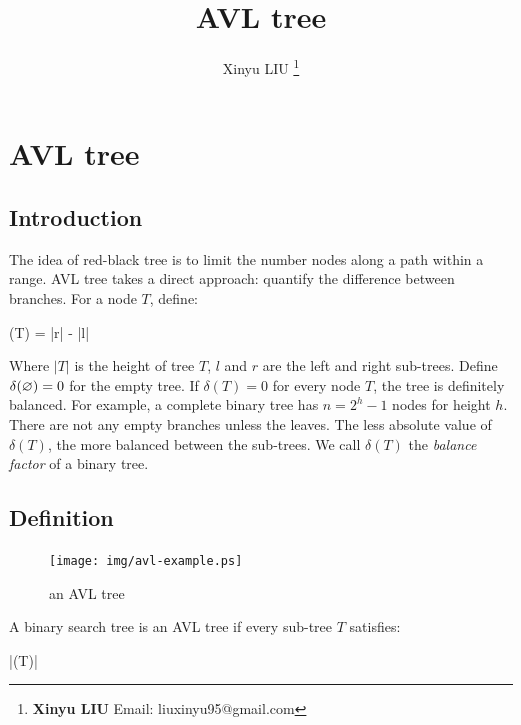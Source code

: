 \documentclass[b5paper]{article}
\begin{document}
\title{AVL tree}

\author{Xinyu LIU
\thanks{{\bfseries Xinyu LIU} \newline
  Email: liuxinyu95@gmail.com \newline}
  }

\maketitle
\fi


\ifx\wholebook\relax
\chapter{AVL tree}
\fi

\section{Introduction}
\label{introduction} 

The idea of red-black tree is to limit the number nodes along a path within a range. AVL tree takes a direct approach: quantify the difference between branches. For a node $T$, define:

\be
  \delta(T) = |r| - |l|
\ee

Where $|T|$ is the height of tree $T$, $l$ and $r$ are the left and right sub-trees. Define $\delta(\varnothing) = 0$ for the empty tree. If $\delta(T) = 0$ for every node $T$, the tree is definitely balanced. For example, a complete binary tree has $n=2^h - 1$ nodes for height $h$. There are not any empty branches unless the leaves. The less absolute value of $\delta(T)$, the more balanced between the sub-trees. We call $\delta(T)$ the {\em balance factor} of a binary tree.

\section{Definition}

\begin{figure}[htbp]
   \centering
   \texttt{[image: img/avl-example.ps]}
   \caption{an AVL tree}
   \label{fig:avl-example}
\end{figure}

A binary search tree is an AVL tree if every sub-tree $T$ satisfies:

\be
  |\delta(T)| 
  \label{eq:avl-rule}
\ee
\end{document}
